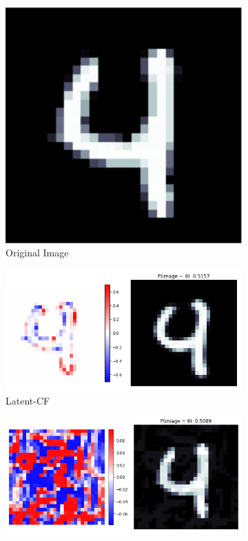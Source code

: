 \documentclass[letterpaper]{article} %
\begin{document}
\begin{figure}[hbt!]
    \centering
    \begin{subfigure}{0.6\textwidth}
        \centering
        \includegraphics[width=0.4\linewidth]{figures/mnist/original.png}
        \caption{Original Image}
        \label{fig:original}
    \end{subfigure}
    \begin{subfigure}{0.5\textwidth}
        \centering
        \includegraphics[width=0.99\linewidth]{figures/mnist/latent.png}
        \caption{Latent-CF}
        \label{fig:latent}
    \end{subfigure}
    \begin{subfigure}{0.5\textwidth}
        \centering
        \includegraphics[width=0.99\linewidth]{figures/mnist/simple.png}

\end{subfigure}
\end{figure}
\end{document}
